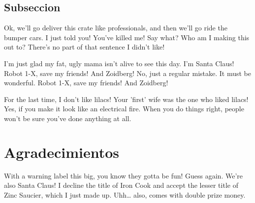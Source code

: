 \documentclass[10pt]{informe_db} %
\begin{document}
\subsection{Subseccion}
Ok, we'll go deliver this crate like professionals, and then we'll go ride the bumper cars. I just told you! You've killed me! Say what? Who am I making this out to? There's no part of that sentence I didn't like!

I'm just glad my fat, ugly mama isn't alive to see this day. I'm Santa Claus! Robot 1-X, save my friends! And Zoidberg! No, just a regular mistake. It must be wonderful. Robot 1-X, save my friends! And Zoidberg!

For the last time, I don't like lilacs! Your 'first' wife was the one who liked lilacs! Yes, if you make it look like an electrical fire. When you do things right, people won't be sure you've done anything at all.





\section*{Agradecimientos} %


With a warning label this big, you know they gotta be fun! Guess again. We're also Santa Claus! I decline the title of Iron Cook and accept the lesser title of Zinc Saucier, which I just made up. Uhh… also, comes with double prize money.



\nocite{*}
\end{document}
